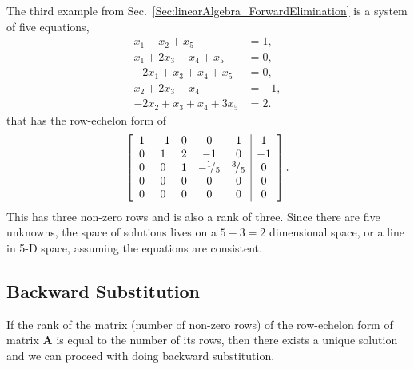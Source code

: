 The third example from Sec.~\ref{Sec:linearAlgebra_ForwardElimination} is a system of five equations, 
\begin{align}
     x_1 -   x_2                 +   x_5 &=  1, \nonumber \\
     x_1         + 2 x_3 -   x_4 +   x_5 &=  0, \nonumber \\
  -2 x_1         +   x_3 +   x_4 +   x_5 &=  0, \nonumber \\
             x_2 + 2 x_3 -   x_4         &= -1, \nonumber \\
         - 2 x_2 +   x_3 +   x_4 + 3 x_5 &=  2. \nonumber     
\end{align}
that has the row-echelon form of
\begin{align}
  \left[ \begin{array}{c c c c c | c} 
   1 & -1 &  0 &  0 &  1 &  1 \\
   0 &  1 &  2 & -1 &  0 & -1 \\
   0 &  0 &  1 & -{}^{1}\!/_{5} &  {}^{3}\!/_{5} &  0 \\
   0 &  0 &  0 &  0 &  0 &  0 \\ 
   0 &  0 &  0 &  0 &  0 &  0 \\ \end{array} \right]. \nonumber
\end{align}
This has three non-zero rows and is also a rank of three. Since there are five unknowns, the space of solutions lives on a $5-3 = 2$ dimensional space, or a line in 5-D space, assuming the equations are consistent.

\subsection{Backward Substitution} \label{Sec:linearAlgebra_BackwardSubstitution}

If the rank of the matrix (number of non-zero rows) of the row-echelon form of matrix $\mathbf{A}$ is equal to the number of its rows, then there exists a unique solution and we can proceed with doing backward substitution.

